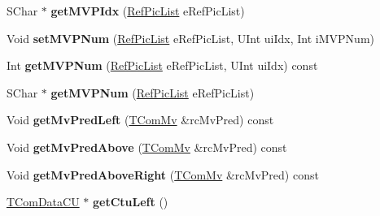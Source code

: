 \begin{DoxyCompactItemize}
\item 
\mbox{\label{class_t_com_data_c_u_afb47f8c935e5ed680be148357e455e15}} 
S\+Char $\ast$ {\bfseries get\+M\+V\+P\+Idx} (\hyperlink{_type_def_8h_a93cea48eb9dcfd661168dee82e41b384}{Ref\+Pic\+List} e\+Ref\+Pic\+List)
\item 
\mbox{\label{class_t_com_data_c_u_a89055adcb3098b5808c2d7f6d405dce5}} 
Void {\bfseries set\+M\+V\+P\+Num} (\hyperlink{_type_def_8h_a93cea48eb9dcfd661168dee82e41b384}{Ref\+Pic\+List} e\+Ref\+Pic\+List, U\+Int ui\+Idx, Int i\+M\+V\+P\+Num)
\item 
\mbox{\label{class_t_com_data_c_u_aaa8fa398d2f447653568f0517f9b26ce}} 
Int {\bfseries get\+M\+V\+P\+Num} (\hyperlink{_type_def_8h_a93cea48eb9dcfd661168dee82e41b384}{Ref\+Pic\+List} e\+Ref\+Pic\+List, U\+Int ui\+Idx) const
\item 
\mbox{\label{class_t_com_data_c_u_a88590426963699f76875744363bb047a}} 
S\+Char $\ast$ {\bfseries get\+M\+V\+P\+Num} (\hyperlink{_type_def_8h_a93cea48eb9dcfd661168dee82e41b384}{Ref\+Pic\+List} e\+Ref\+Pic\+List)
\item 
\mbox{\label{class_t_com_data_c_u_a63f68a629c0eb4d26c66edbe6a4805bc}} 
Void {\bfseries get\+Mv\+Pred\+Left} (\hyperlink{class_t_com_mv}{T\+Com\+Mv} \&rc\+Mv\+Pred) const
\item 
\mbox{\label{class_t_com_data_c_u_a07533d64f03aa825adb8a27c6cd76ebc}} 
Void {\bfseries get\+Mv\+Pred\+Above} (\hyperlink{class_t_com_mv}{T\+Com\+Mv} \&rc\+Mv\+Pred) const
\item 
\mbox{\label{class_t_com_data_c_u_af87ec6e5751a7cff57b7d6240229c29c}} 
Void {\bfseries get\+Mv\+Pred\+Above\+Right} (\hyperlink{class_t_com_mv}{T\+Com\+Mv} \&rc\+Mv\+Pred) const
\item 
\mbox{\label{class_t_com_data_c_u_af1a1da576e24d9b46b4d4bbc67080e80}} 
\hyperlink{class_t_com_data_c_u}{T\+Com\+Data\+CU} $\ast$ {\bfseries get\+Ctu\+Left} ()
\item 
\mbox{\label{class_t_com_data_c_u_a89e623fe26fa1ab830d3126f5647b981}} 

\end{DoxyCompactItemize}

